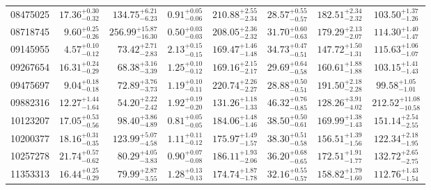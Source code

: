 \documentclass[structabstract]{aa}
\begin{document}
\begin{table*}
\begin{tabular}{l r r c c c c c}
08475025         & $17.36_{-0.32}^{+0.30}$   &   $134.75_{-6.23}^{+6.21}$   &   $0.91_{-0.06}^{+0.05}$   &   $210.88_{-2.34}^{+2.55}$   &   $28.57_{-0.57}^{+0.55}$   &   $182.51_{-2.32}^{+2.34}$   &   $103.50_{-1.26}^{+1.37}$ \\[1pt]
08718745         & $9.60_{-0.26}^{+0.25}$   &   $256.99_{-16.30}^{+15.87}$   &   $0.50_{-0.03}^{+0.03}$   &   $208.05_{-2.32}^{+2.36}$   &   $31.70_{-0.63}^{+0.60}$   &   $179.29_{-2.07}^{+2.13}$   &   $114.30_{-1.47}^{+1.40}$ \\[1pt]
09145955         & $4.57_{-0.12}^{+0.10}$   &   $73.42_{-2.83}^{+2.71}$   &   $2.13_{-0.15}^{+0.15}$   &   $169.47_{-1.48}^{+1.46}$   &   $34.73_{-0.51}^{+0.47}$   &   $147.72_{-1.31}^{+1.50}$   &   $115.63_{-1.07}^{+1.06}$ \\[1pt]
09267654         & $16.31_{-0.29}^{+0.24}$   &   $68.38_{-3.39}^{+3.16}$   &   $1.25_{-0.12}^{+0.10}$   &   $169.16_{-2.17}^{+2.15}$   &   $29.69_{-0.58}^{+0.64}$   &   $160.61_{-1.88}^{+1.88}$   &   $103.15_{-1.43}^{+1.41}$ \\[1pt]
09475697         & $9.04_{-0.18}^{+0.18}$   &   $72.89_{-3.73}^{+3.76}$   &   $1.19_{-0.11}^{+0.10}$   &   $220.74_{-2.27}^{+2.26}$   &   $28.88_{-0.51}^{+0.50}$   &   $191.50_{-2.28}^{+2.18}$   &   $99.58_{-1.01}^{+1.05}$ \\[1pt]
09882316         & $12.27_{-1.64}^{+1.44}$   &   $54.20_{-2.42}^{+2.22}$   &   $1.92_{-0.20}^{+0.19}$   &   $131.26_{-1.33}^{+1.18}$   &   $46.32_{-0.85}^{+0.76}$   &   $128.26_{-4.02}^{+3.91}$   &   $212.52_{-10.58}^{+11.08}$ \\[1pt]
10123207         & $17.05_{-0.56}^{+0.53}$   &   $98.40_{-4.89}^{+3.86}$   &   $0.81_{-0.05}^{+0.05}$   &   $184.06_{-1.46}^{+1.48}$   &   $38.50_{-0.61}^{+0.50}$   &   $169.99_{-1.43}^{+1.38}$   &   $151.14_{-2.55}^{+2.54}$ \\[1pt]
10200377         & $18.16_{-0.35}^{+0.31}$   &   $123.99_{-4.58}^{+5.07}$   &   $1.11_{-0.12}^{+0.11}$   &   $175.97_{-1.57}^{+1.49}$   &   $38.30_{-0.58}^{+0.51}$   &   $156.51_{-1.56}^{+1.39}$   &   $122.34_{-1.95}^{+2.18}$ \\[1pt]
10257278         & $21.74_{-0.62}^{+0.57}$   &   $80.29_{-3.83}^{+4.05}$   &   $0.90_{-0.08}^{+0.07}$   &   $186.11_{-2.06}^{+1.93}$   &   $36.20_{-0.65}^{+0.68}$   &   $172.51_{-1.77}^{+1.91}$   &   $132.72_{-2.75}^{+2.65}$ \\[1pt]
11353313         & $16.44_{-0.29}^{+0.25}$   &   $79.99_{-3.55}^{+2.87}$   &   $1.28_{-0.13}^{+0.13}$   &   $174.74_{-1.78}^{+1.87}$   &   $32.16_{-0.57}^{+0.55}$   &   $158.82_{-1.60}^{+1.79}$   &   $112.76_{-1.54}^{+1.43}$ \\[1pt]

\end{tabular}
\end{table*}
\end{document}
